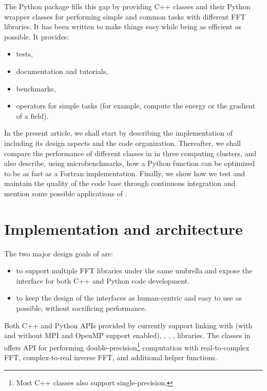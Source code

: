 \documentclass{../jors}
\begin{document}
The Python package  fills this gap by providing C++ classes and
their Python wrapper classes for performing simple and common tasks with different
FFT libraries. It has been written to make things easy while being as efficient as
possible. It provides:

\begin{itemize}
\item tests,

\item documentation and tutorials,

\item benchmarks,

\item operators for simple tasks (for example, compute the energy or the
gradient of a field).

\end{itemize}

In the present article, we shall start by describing the implementation of
 including its design aspects and the code organization. Thereafter,
we shall compare the performance of different classes in  in
three computing clusters, and also describe, using microbenchmarks, how a Python
function can be optimized to be as fast as a Fortran implementation. Finally,
we show how we test and maintain the quality of the code base through
continuous integration and mention some possible applications of
.

\section*{Implementation and architecture}

The two major design goals of  are:
\begin{itemize}
 \item to support multiple FFT libraries under the same umbrella and expose the
 interface for both C++ and Python code development.
 \item to keep the design of the interfaces as human-centric and easy to use as
 possible, without sacrificing performance.
\end{itemize}

Both C++ and Python APIs provided by  currently support linking
with  (with and without MPI and OpenMP support enabled),
, , ,  libraries. The
classes in  offers API for performing
double-precision\footnote{Most C++ classes also support single-precision.}
computation with real-to-complex FFT, complex-to-real inverse FFT, and additional
helper functions.
\end{document}
